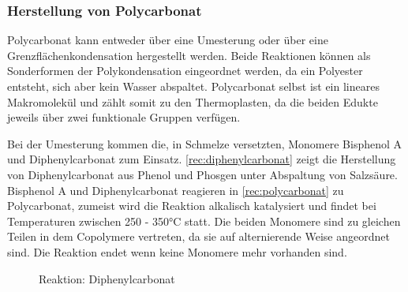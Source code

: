 \subsubsection{Herstellung von Polycarbonat}

Polycarbonat kann entweder über eine Umesterung oder über eine
Grenzflächenkondensation hergestellt werden. Beide Reaktionen können als
Sonderformen der Polykondensation eingeordnet werden, da ein Polyester entsteht,
sich aber kein Wasser abspaltet. Polycarbonat selbst ist ein lineares
Makromolekül und zählt somit zu den Thermoplasten, da die beiden Edukte
jeweils über zwei funktionale Gruppen verfügen.

Bei der Umesterung kommen die, in Schmelze versetzten, Monomere Bisphenol A und
Diphenylcarbonat zum Einsatz. \autoref{rec:diphenylcarbonat} zeigt die
Herstellung von Diphenylcarbonat aus Phenol und Phosgen unter Abspaltung von
Salzsäure. Bisphenol A und Diphenylcarbonat reagieren in
\autoref{rec:polycarbonat} zu Polycarbonat, zumeist wird die Reaktion alkalisch
katalysiert und findet bei Temperaturen zwischen 250 - 350°C statt. Die beiden
Monomere sind zu gleichen Teilen in dem Copolymere vertreten, da sie auf
alternierende Weise angeordnet sind. Die Reaktion endet wenn keine Monomere mehr
vorhanden sind.

\begin{figure}[h]
    \begin{center}
        \footnotesize
        \setatomsep{1.7em}

        \chemsign{+}
        \chemrel{->}
        \chemsign{+}

        \caption{Reaktion: Diphenylcarbonat}
        \label{rec:diphenylcarbonat}
    \end{center}
\end{figure}


